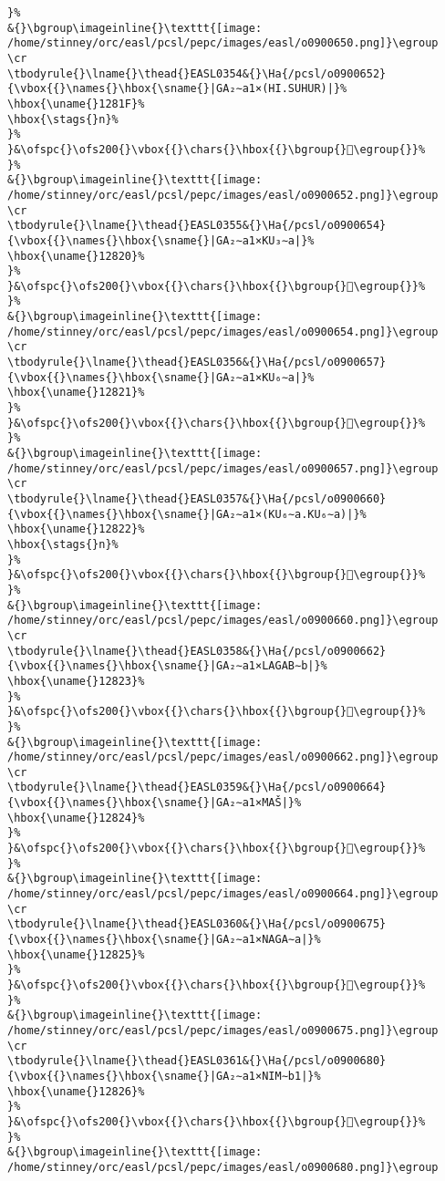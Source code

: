 \begin{verbatim}
}%
&{}\bgroup\imageinline{}\texttt{[image: /home/stinney/orc/easl/pcsl/pepc/images/easl/o0900650.png]}\egroup
\cr
\tbodyrule{}\lname{}\thead{}EASL0354&{}\Ha{/pcsl/o0900652}{\vbox{{}\names{}\hbox{\sname{}|GA₂∼a1×(HI.SUHUR)|}%
\hbox{\uname{}1281F}%
\hbox{\stags{}n}%
}%
}&\ofspc{}\ofs200{}\vbox{{}\chars{}\hbox{{}\bgroup{}𒠟\egroup{}}%
}%
&{}\bgroup\imageinline{}\texttt{[image: /home/stinney/orc/easl/pcsl/pepc/images/easl/o0900652.png]}\egroup
\cr
\tbodyrule{}\lname{}\thead{}EASL0355&{}\Ha{/pcsl/o0900654}{\vbox{{}\names{}\hbox{\sname{}|GA₂∼a1×KU₃∼a|}%
\hbox{\uname{}12820}%
}%
}&\ofspc{}\ofs200{}\vbox{{}\chars{}\hbox{{}\bgroup{}𒠠\egroup{}}%
}%
&{}\bgroup\imageinline{}\texttt{[image: /home/stinney/orc/easl/pcsl/pepc/images/easl/o0900654.png]}\egroup
\cr
\tbodyrule{}\lname{}\thead{}EASL0356&{}\Ha{/pcsl/o0900657}{\vbox{{}\names{}\hbox{\sname{}|GA₂∼a1×KU₆∼a|}%
\hbox{\uname{}12821}%
}%
}&\ofspc{}\ofs200{}\vbox{{}\chars{}\hbox{{}\bgroup{}𒠡\egroup{}}%
}%
&{}\bgroup\imageinline{}\texttt{[image: /home/stinney/orc/easl/pcsl/pepc/images/easl/o0900657.png]}\egroup
\cr
\tbodyrule{}\lname{}\thead{}EASL0357&{}\Ha{/pcsl/o0900660}{\vbox{{}\names{}\hbox{\sname{}|GA₂∼a1×(KU₆∼a.KU₆∼a)|}%
\hbox{\uname{}12822}%
\hbox{\stags{}n}%
}%
}&\ofspc{}\ofs200{}\vbox{{}\chars{}\hbox{{}\bgroup{}𒠢\egroup{}}%
}%
&{}\bgroup\imageinline{}\texttt{[image: /home/stinney/orc/easl/pcsl/pepc/images/easl/o0900660.png]}\egroup
\cr
\tbodyrule{}\lname{}\thead{}EASL0358&{}\Ha{/pcsl/o0900662}{\vbox{{}\names{}\hbox{\sname{}|GA₂∼a1×LAGAB∼b|}%
\hbox{\uname{}12823}%
}%
}&\ofspc{}\ofs200{}\vbox{{}\chars{}\hbox{{}\bgroup{}𒠣\egroup{}}%
}%
&{}\bgroup\imageinline{}\texttt{[image: /home/stinney/orc/easl/pcsl/pepc/images/easl/o0900662.png]}\egroup
\cr
\tbodyrule{}\lname{}\thead{}EASL0359&{}\Ha{/pcsl/o0900664}{\vbox{{}\names{}\hbox{\sname{}|GA₂∼a1×MAŠ|}%
\hbox{\uname{}12824}%
}%
}&\ofspc{}\ofs200{}\vbox{{}\chars{}\hbox{{}\bgroup{}𒠤\egroup{}}%
}%
&{}\bgroup\imageinline{}\texttt{[image: /home/stinney/orc/easl/pcsl/pepc/images/easl/o0900664.png]}\egroup
\cr
\tbodyrule{}\lname{}\thead{}EASL0360&{}\Ha{/pcsl/o0900675}{\vbox{{}\names{}\hbox{\sname{}|GA₂∼a1×NAGA∼a|}%
\hbox{\uname{}12825}%
}%
}&\ofspc{}\ofs200{}\vbox{{}\chars{}\hbox{{}\bgroup{}𒠥\egroup{}}%
}%
&{}\bgroup\imageinline{}\texttt{[image: /home/stinney/orc/easl/pcsl/pepc/images/easl/o0900675.png]}\egroup
\cr
\tbodyrule{}\lname{}\thead{}EASL0361&{}\Ha{/pcsl/o0900680}{\vbox{{}\names{}\hbox{\sname{}|GA₂∼a1×NIM∼b1|}%
\hbox{\uname{}12826}%
}%
}&\ofspc{}\ofs200{}\vbox{{}\chars{}\hbox{{}\bgroup{}𒠦\egroup{}}%
}%
&{}\bgroup\imageinline{}\texttt{[image: /home/stinney/orc/easl/pcsl/pepc/images/easl/o0900680.png]}\egroup

\end{verbatim}
